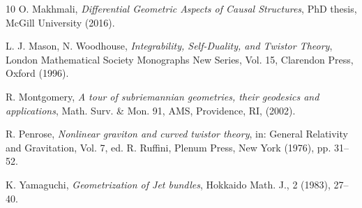 \documentclass[11pt]{amsart}
\theoremstyle{definition}
\begin{document}
\begin{thebibliography}{10}
 O. Makhmali, \textit{Differential Geometric Aspects of Causal Structures}, PhD thesis, McGill University (2016).

 L. J. Mason, N. Woodhouse, \textit{Integrability, Self-Duality, and Twistor Theory}, London Mathematical Society Monographs New Series, Vol. 15, Clarendon Press, Oxford (1996).

 R. Montgomery, \textit{A tour of subriemannian geometries, their geodesics and applications}, Math. Surv. \& Mon. 91, AMS, Providence, RI, (2002).

 R. Penrose, \textit{Nonlinear graviton and curved twistor theory}, in: General Relativity and Gravitation, Vol. 7, ed. R. Ruffini, Plenum Press, New York (1976), pp. 31--52.

 K. Yamaguchi, \textit{Geometrization of Jet bundles}, Hokkaido Math. J., 2 (1983), 27--40.

\end{thebibliography}
\end{document}
